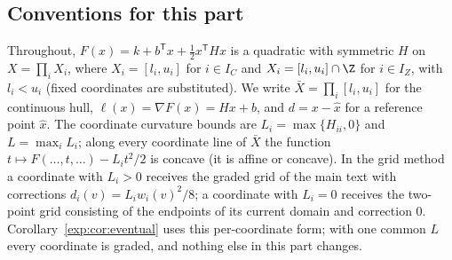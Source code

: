 
\subsection*{Conventions for this part}

Throughout, $F(x)=k+b^{\mathsf T}x+\tfrac12x^{\mathsf T}Hx$ is a quadratic with
symmetric $H$ on $X=\prod_iX_i$, where $X_i=[l_i,u_i]$ for $i\in I_C$ and
$X_i=[l_i,u_i]\cap\Z$ for $i\in I_Z$, with $l_i<u_i$ (fixed coordinates are
substituted). We write $\bar X=\prod_i[l_i,u_i]$ for the continuous hull,
$\ell(x)=\nabla F(x)=Hx+b$, and $d=x-\hat x$ for a reference point $\hat x$.
The coordinate curvature bounds are $L_i=\max\{H_{ii},0\}$ and
$L=\max_iL_i$; along every coordinate line of $\bar X$ the function
$t\mapsto F(\dots,t,\dots)-L_it^2/2$ is concave (it is affine or concave).
In the grid method a coordinate with $L_i>0$ receives the graded grid of the
main text with corrections $d_i(v)=L_iw_i(v)^2/8$; a coordinate with $L_i=0$
receives the two-point grid consisting of the endpoints of its current
domain and correction $0$. Corollary~\ref{exp:cor:eventual} uses this
per-coordinate form; with one common $L$ every coordinate is graded, and
nothing else in this part changes.


